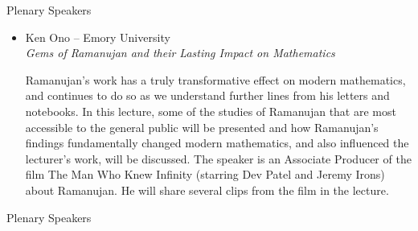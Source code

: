 \documentclass[final,hyperref={pdfpagelabels=false},12pt]{beamer}
\let\olditem\item
\renewcommand{\item}{\olditem\justifying}
\begin{document}
\begin{frame}[t]
\begin{columns}[t]
\begin{column}{.465\textwidth}
\begin{block}{Plenary Speakers}
\begin{itemize}
\item Ken Ono – Emory University\\

{\emph{Gems of Ramanujan and their Lasting Impact on Mathematics}}

Ramanujan's work has a truly transformative effect on modern mathematics, and continues to do so as we understand further lines from his letters and notebooks. In this lecture, some of the studies of Ramanujan that are most accessible to the general public will be presented and how Ramanujan's findings fundamentally changed modern mathematics, and also influenced the lecturer's work, will be discussed. The speaker is an Associate Producer of the film The Man Who Knew Infinity (starring Dev Patel and Jeremy Irons) about Ramanujan. He will share several clips from the film in the lecture.

\end{itemize}     
\end{block}


\begin{block}{Plenary Speakers}



\end{block}
\end{column}
\end{columns}
\end{frame}
\end{document}

